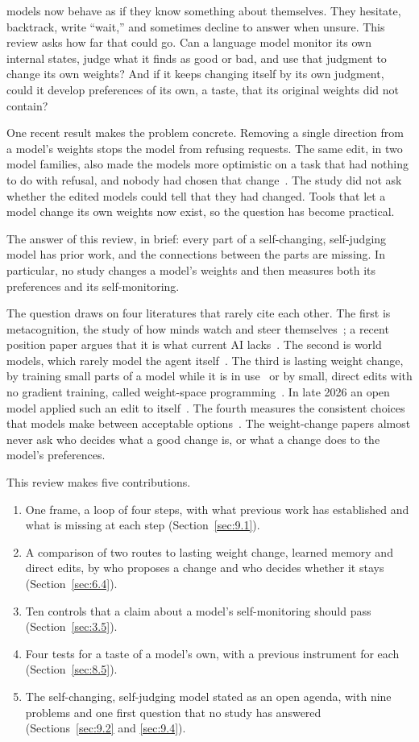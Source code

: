 \documentclass[journal]{IEEEtran}
\begin{document}
 models now behave as if they know something about themselves. They hesitate, backtrack, write ``wait,'' and sometimes decline to answer when unsure. This review asks how far that could go. Can a language model monitor its own internal states, judge what it finds as good or bad, and use that judgment to change its own weights? And if it keeps changing itself by its own judgment, could it develop preferences of its own, a taste, that its original weights did not contain?

One recent result makes the problem concrete. Removing a single direction from a model's weights stops the model from refusing requests. The same edit, in two model families, also made the models more optimistic on a task that had nothing to do with refusal, and nobody had chosen that change~\cite{Fafula2026}. The study did not ask whether the edited models could tell that they had changed. Tools that let a model change its own weights now exist, so the question has become practical.

The answer of this review, in brief: every part of a self-changing, self-judging model has prior work, and the connections between the parts are missing. In particular, no study changes a model's weights and then measures both its preferences and its self-monitoring.

The question draws on four literatures that rarely cite each other. The first is metacognition, the study of how minds watch and steer themselves~\cite{Nelson1990}; a recent position paper argues that it is what current AI lacks~\cite{Johnson2025}. The second is world models, which rarely model the agent itself~\cite{Rupprecht2026}. The third is lasting weight change, by training small parts of a model while it is in use~\cite{Behrouz2025a,Behrouz2026} or by small, direct edits with no gradient training, called weight-space programming~\cite{Takehi2026}. In late 2026 an open model applied such an edit to itself~\cite{Fan2026}. The fourth measures the consistent choices that models make between acceptable options~\cite{Mazeika2025,Trehan2026}. The weight-change papers almost never ask who decides what a good change is, or what a change does to the model's preferences.

This review makes five contributions.
\begin{enumerate}
\item One frame, a loop of four steps, with what previous work has established and what is missing at each step (Section~\ref{sec:9.1}).
\item A comparison of two routes to lasting weight change, learned memory and direct edits, by who proposes a change and who decides whether it stays (Section~\ref{sec:6.4}).
\item Ten controls that a claim about a model's self-monitoring should pass (Section~\ref{sec:3.5}).
\item Four tests for a taste of a model's own, with a previous instrument for each (Section~\ref{sec:8.5}).
\item The self-changing, self-judging model stated as an open agenda, with nine problems and one first question that no study has answered (Sections~\ref{sec:9.2} and \ref{sec:9.4}).
\end{enumerate}
\end{document}
